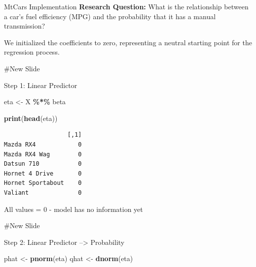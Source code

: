 \documentclass[
  ignorenonframetext,
]{beamer}
\newenvironment{Shaded}{\begin{snugshade}}{\end{snugshade}}
\newcommand{\AttributeTok}[1]{\textcolor[rgb]{0.13,0.29,0.53}{#1}}
\newcommand{\CommentTok}[1]{\textcolor[rgb]{0.56,0.35,0.01}{\textit{#1}}}
\newcommand{\DecValTok}[1]{\textcolor[rgb]{0.00,0.00,0.81}{#1}}
\newcommand{\FunctionTok}[1]{\textcolor[rgb]{0.13,0.29,0.53}{\textbf{#1}}}
\newcommand{\NormalTok}[1]{#1}
\newcommand{\OtherTok}[1]{\textcolor[rgb]{0.56,0.35,0.01}{#1}}
\newcommand{\SpecialCharTok}[1]{\textcolor[rgb]{0.81,0.36,0.00}{\textbf{#1}}}
\begin{document}
\begin{frame}[fragile]{MtCars Implementation}
\protect{}\label{mtcars-implementation}
\textbf{Research Question:} What is the relationship between a car's
fuel efficiency (MPG) and the probability that it has a manual
transmission?

\begin{Shaded}
\end{Shaded}

We initialized the coefficients to zero, representing a neutral starting
point for the regression process.

\#New Slide

\begin{block}{Step 1: Linear Predictor}
\protect{}\label{step-1-linear-predictor-1}
\begin{Shaded}
\begin{Highlighting}[]
\NormalTok{eta }\OtherTok{\textless{}{-}}\NormalTok{ X }\SpecialCharTok{\%*\%}\NormalTok{ beta}

\FunctionTok{print}\NormalTok{(}\FunctionTok{head}\NormalTok{(eta))}
\end{Highlighting}
\end{Shaded}

\begin{verbatim}
                  [,1]
Mazda RX4            0
Mazda RX4 Wag        0
Datsun 710           0
Hornet 4 Drive       0
Hornet Sportabout    0
Valiant              0
\end{verbatim}

All values = 0 - model has no information yet

\#New Slide
\end{block}

\begin{block}{Step 2: Linear Predictor --\textgreater{} Probability}
\protect{}\label{step-2-linear-predictor-probability-1}
\begin{Shaded}
\begin{Highlighting}[]
\NormalTok{phat }\OtherTok{\textless{}{-}} \FunctionTok{pnorm}\NormalTok{(eta)}
\NormalTok{qhat }\OtherTok{\textless{}{-}} \FunctionTok{dnorm}\NormalTok{(eta)}


\end{Highlighting}
\end{Shaded}
\end{block}
\end{frame}
\end{document}
